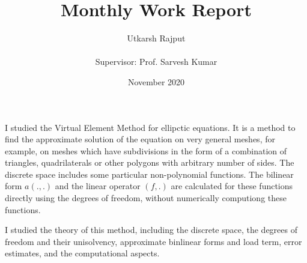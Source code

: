 \documentclass[12pt]{article}
\title{Monthly Work Report}
\date{November 2020}
\author{Utkarsh Rajput \\\\{Supervisor: Prof. Sarvesh Kumar}}
\begin{document}
	\maketitle
	I studied the Virtual Element Method for ellipctic equations. It is a method to find the approximate solution of the equation on very general meshes, for example, on meshes which have subdivisions in the form of a combination of triangles, quadrilaterals or other polygons with arbitrary number of sides. The discrete space includes some particular non-polynomial functions. The bilinear form $a(.,.)$ and the linear operator $(f,.)$ are calculated for these functions directly using the degrees of freedom, without numerically computiong these functions.
	
	I studied the theory of this method, including the discrete space, the degrees of freedom and their unisolvency, approximate binlinear forms and load term, error estimates, and the computational aspects.
	
	
	
	
	
	
\end{document}
